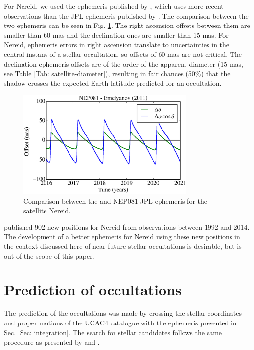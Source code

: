 \documentclass[useAMS,usenatbib]{mn2e}
\begin{document}
For Nereid, we used the ephemeris published by \cite{Emelyanov2011}, which uses more recent observations than the JPL ephemeris published by \cite{Jacobson2009}. The comparison between the two ephemeris can be seen in Fig. \ref{Fig:eph-Nereid}. The right ascension offsets between them are smaller than 60 mas and the declination ones are smaller than 15 mas. For Nereid, ephemeris errors in right ascension translate to uncertainties in the central instant of a stellar occultation, so offsets of 60 mas are not critical. The declination ephemeris offsets are of the order of the apparent diameter (15 mas, see Table \ref{Tab: satellite-diameter}), resulting in fair chances (50\%) that the shadow crosses the expected Earth latitude predicted for an occultation. 

\begin{figure}
\begin{centering}
\includegraphics[width=8.8cm]{figures/JPL-EME_Nereid.eps}
\caption{Comparison between the \protect\cite{Emelyanov2011} and NEP081 JPL \protect\citep{Jacobson2009} ephemeris for the satellite Nereid.}
\label{Fig:eph-Nereid}
\end{centering}
\end{figure}

\cite{GomesJunior2015} published 902 new positions for Nereid from observations between 1992 and 2014. The development of a better ephemeris for Nereid using these new positions in the context discussed here of near future stellar occultations is desirable, but is out of the scope of this paper.  

\section{Prediction of occultations} \label{Sec: predictions}

The prediction of the occultations was made by crossing the stellar coordinates and proper motions of the UCAC4 catalogue \citep{Zacharias2013} with the ephemeris presented in Sec. \ref{Sec: integration}. The search for stellar candidates follows the same procedure as presented by \cite{Assafin2010, Assafin2012} and \cite{Camargo2014}.
\end{document}
